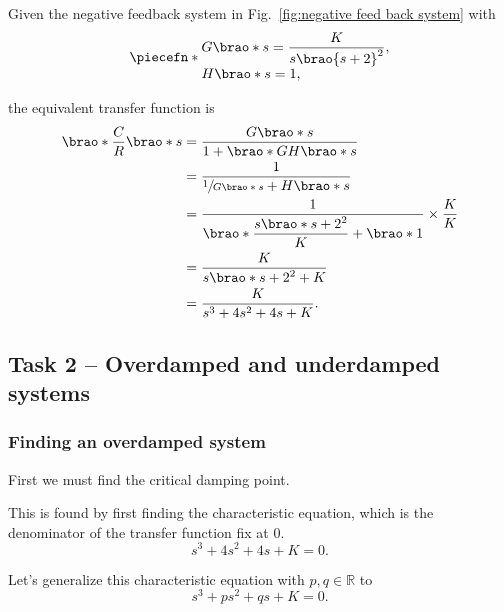 \documentclass[12pt]{article}
\DeclarePairedDelimiter\brao()%
\DeclarePairedDelimiter\piecefn\{.
\begin{document}
Given the negative feedback system in Fig.~\ref{fig:negative feed back system}
with
\begin{equation}
    \piecefn*{
        \begin{array}{@{}l@{}}
            \displaystyle
            G\brao*s = \frac{K}{s\brao{s + 2}^2},\\*
            H\brao*s = 1,
        \end{array}
    }
\end{equation}

the equivalent transfer function is
\begin{equation}
    \begin{aligned}
        \brao*{\frac{C}{R}}\brao*s
            &{}= \frac{G\brao*s}{1 + \brao*{GH}\brao*s}
    \\*
            &{}= \frac{1}{\displaystyle\sfrac1{G\brao*s} + H\brao*s}
    \\*
            &{}= \frac{1}{\displaystyle\brao*{\frac{s\brao*{s + 2}^2}K} + \brao*1} \times \frac{K}K
    \\*
            &{}= \frac{K}{s\brao*{s + 2}^2 + K}
    \\*
            &{}= \frac{K}{s^3 + 4s^2 + 4s + K}.
    \\*
    \end{aligned}
\end{equation}

\subsection{Task 2 -- Overdamped and underdamped systems}

\subsubsection{Finding an overdamped system}\label{sss:overdamped procedure}

First we must find the critical damping point.

This is found by first finding the characteristic equation, which is the denominator of the transfer function fix at $0$.
\begin{equation}
    s^3 + 4s^2 + 4s + K = 0.
\end{equation}

Let's generalize this characteristic equation with $p, q \in \mathbb{R}$ to
\begin{equation}
    s^3 + ps^2 + qs + K = 0.
\end{equation}
\end{document}
